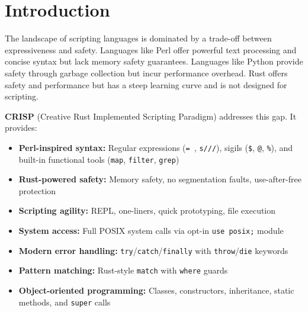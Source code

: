 \section{Introduction}

The landscape of scripting languages is dominated by a trade-off between expressiveness and safety. Languages like Perl offer powerful text processing and concise syntax but lack memory safety guarantees. Languages like Python provide safety through garbage collection but incur performance overhead. Rust offers safety and performance but has a steep learning curve and is not designed for scripting.

\textbf{CRISP} (Creative Rust Implemented Scripting Paradigm) addresses this gap. It provides:

\begin{itemize}
    \item \textbf{Perl-inspired syntax:} Regular expressions (\texttt{=~}, \texttt{s///}), sigils (\texttt{\$}, \texttt{@}, \texttt{\%}), and built-in functional tools (\texttt{map}, \texttt{filter}, \texttt{grep})
    \item \textbf{Rust-powered safety:} Memory safety, no segmentation faults, use-after-free protection
    \item \textbf{Scripting agility:} REPL, one-liners, quick prototyping, file execution
    \item \textbf{System access:} Full POSIX system calls via opt-in \texttt{use posix;} module
    \item \textbf{Modern error handling:} \texttt{try}/\texttt{catch}/\texttt{finally} with \texttt{throw}/\texttt{die} keywords
    \item \textbf{Pattern matching:} Rust-style \texttt{match} with \texttt{where} guards
    \item \textbf{Object-oriented programming:} Classes, constructors, inheritance, static methods, and \texttt{super} calls
\end{itemize}

